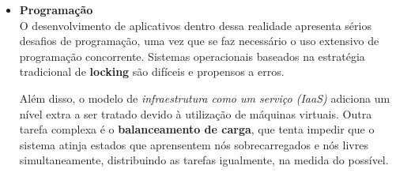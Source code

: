 \documentclass{llncs}
\begin{document}
\begin{itemize}
\item \textbf{Programação} \\
O desenvolvimento de aplicativos dentro dessa realidade apresenta sérios desafios de programação, uma vez que se faz necessário o uso extensivo de programação concorrente. Sistemas operacionais baseados na estratégia tradicional de \textbf{locking} são difíceis e propensos a erros.

Além disso, o modelo de \emph{infraestrutura como um serviço (IaaS)} adiciona um nível extra a ser tratado devido à utilização de máquinas virtuais. Outra tarefa complexa é o \textbf{balanceamento de carga}, que tenta impedir que o sistema atinja estados que aprensentem nós sobrecarregados e nós livres simultaneamente, distribuindo as tarefas igualmente, na medida do possível.

\end{itemize}


\end{document}
